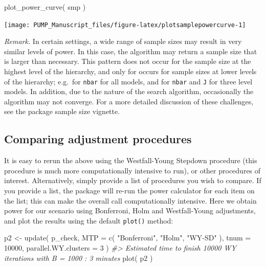 \documentclass[
]{article}
\newenvironment{Shaded}{\begin{snugshade}}{\end{snugshade}}
\newcommand{\AttributeTok}[1]{\textcolor[rgb]{0.77,0.63,0.00}{#1}}
\newcommand{\CommentTok}[1]{\textcolor[rgb]{0.56,0.35,0.01}{\textit{#1}}}
\newcommand{\DecValTok}[1]{\textcolor[rgb]{0.00,0.00,0.81}{#1}}
\newcommand{\FunctionTok}[1]{\textcolor[rgb]{0.00,0.00,0.00}{#1}}
\newcommand{\NormalTok}[1]{#1}
\newcommand{\OtherTok}[1]{\textcolor[rgb]{0.56,0.35,0.01}{#1}}
\newcommand{\StringTok}[1]{\textcolor[rgb]{0.31,0.60,0.02}{#1}}
\begin{document}
\begin{Shaded}
\begin{Highlighting}[]
\FunctionTok{plot\_power\_curve}\NormalTok{( smp )}
\end{Highlighting}
\end{Shaded}

\begin{center}\texttt{[image: PUMP\_Manuscript\_files/figure-latex/plotsamplepowercurve-1]} \end{center}

\emph{Remark.} In certain settings, a wide range of sample sizes may
result in very similar levels of power. In this case, the algorithm may
return a sample size that is larger than necessary. This pattern does
not occur for the sample size at the highest level of the hierarchy, and
only for occurs for sample sizes at lower levels of the hierarchy;
e.g.~for \texttt{nbar} for all models, and for \texttt{nbar} and
\texttt{J} for three level models. In addition, due to the nature of the
search algorithm, occasionally the algorithm may not converge. For a
more detailed discussion of these challenges, see the package sample
size vignette.

\subsection{Comparing adjustment procedures}

It is easy to rerun the above using the Westfall-Young Stepdown
procedure (this procedure is much more computationally intensive to
run), or other procedures of interest. Alternatively, simply provide a
list of procedures you wish to compare. If you provide a list, the
package will re-run the power calculator for each item on the list; this
can make the overall call computationally intensive. Here we obtain
power for our scenario using Bonferroni, Holm and Westfall-Young
adjustments, and plot the results using the default \texttt{plot()}
method:

\begin{Shaded}
\begin{Highlighting}[]
\NormalTok{p2 }\OtherTok{\textless{}{-}} \FunctionTok{update}\NormalTok{( p\_check,}
              \AttributeTok{MTP =} \FunctionTok{c}\NormalTok{( }\StringTok{"Bonferroni"}\NormalTok{, }\StringTok{"Holm"}\NormalTok{, }\StringTok{"WY{-}SD"}\NormalTok{ ),}
              \AttributeTok{tnum =} \DecValTok{10000}\NormalTok{,}
              \AttributeTok{parallel.WY.clusters =} \DecValTok{3}\NormalTok{ )}
\CommentTok{\#\textgreater{} Estimated time to finish 10000 WY iterations with B = 1000 : 3 minutes}
\FunctionTok{plot}\NormalTok{( p2 )}
\end{Highlighting}
\end{Shaded}
\end{document}
